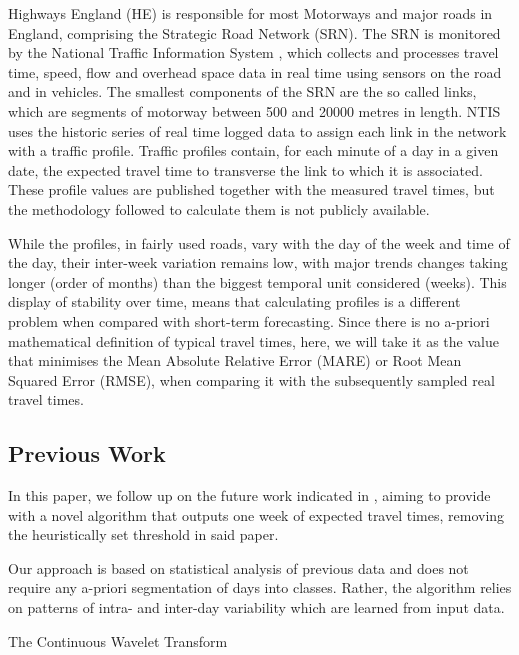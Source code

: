 \documentclass[letterpaper, 10 pt, conference]{ieeeconf}  %
\begin{document}
Highways England (HE) is responsible for most Motorways and major roads in England, comprising the Strategic Road Network (SRN).
The SRN is monitored by the National Traffic Information System \cite{NTIS}, which collects and processes travel time, speed, flow and overhead space data in real time using sensors on the road and in vehicles.
The smallest components of the SRN are the so called links, which are segments of motorway between 500 and 20000 metres in length.
NTIS uses the historic series of real time logged data to assign each link in the network with a traffic profile.
Traffic profiles contain, for each minute of a day in a given date, the expected travel time to transverse the link to which it is associated. 
These profile values are published together with the measured travel times, but the methodology followed to calculate them is not publicly available.

While the profiles, in fairly used roads, vary with the day of the week and time of the day, their inter-week variation remains low, with major trends changes taking longer (order of months) than the biggest temporal unit considered (weeks). 
This display of stability over time, means that calculating profiles is a different problem when compared with short-term forecasting.
Since there is no a-priori mathematical definition of typical travel times, here, we will take it as the value that minimises the Mean Absolute Relative Error (MARE) or Root Mean Squared Error (RMSE), when comparing it with the subsequently sampled real travel times.

\subsection{Previous Work} \label{Previous Work}
In this paper, we follow up on the future work indicated in \cite{ttprofiles}, aiming to provide with a novel algorithm that outputs one week of expected travel times, removing the heuristically set threshold in said paper.

Our approach is based on statistical analysis of previous data and does not require any a-priori segmentation of days into classes. 
Rather, the algorithm relies on patterns of intra- and inter-day variability which are learned from input data.

The Continuous Wavelet Transform \cite{morletwavelet}
\end{document}
